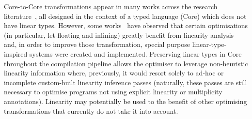 \documentclass[acmsmall,review,anonymous,screen]{acmart}
\newcommand{\parawith}[1]{\paragraph{\emph{#1}}}
\begin{document}
Core-to-Core transformations appear in many works across the research
literature~\cite{cite:let-floating,peytonjones1997a,santos1995compilation,peytonjones2002secrets,baker-finch2004constructed,maurer2017compiling,Breitner2016_1000054251,sergey_vytiniotis_jones_breitner_2017},
all designed in the context of a typed language (Core) which does not have
linear types. However, some works~\cite{cite:let-floating,peytonjones1997a,cite:linearhaskell} have observed that
certain optimisations (in particular, let-floating and inlining) greatly
benefit from linearity analysis and, in order to improve those transformation,
special purpose linear-type-inspired systems were created and implemented.
%
Preserving linear types in Core throughout the compilation pipeline allows the
optimiser to leverage non-heuristic linearity information where, previously, it
would resort solely to ad-hoc or incomplete custom-built linearity inference
passes (naturally, these passes are still necessary to optimise programs not
using explicit linearity or multiplicity annotations). Linearity may
potentially be used to the benefit of other optimising transformations that
currently do not take it into account.


% 
\end{document}
